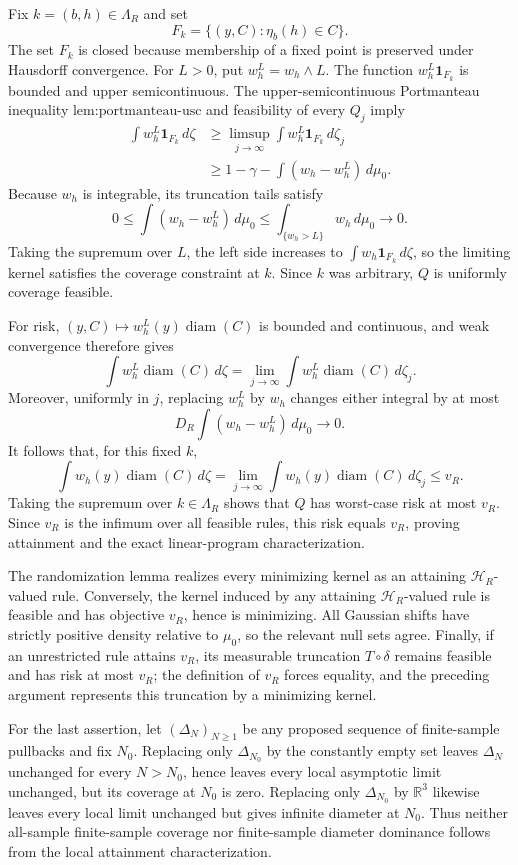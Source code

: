 Fix \(k=(b,h)\in\Lambda_R\) and set
\[
F_k=\{(y,C):\eta_b(h)\in C\}.
\]
The set \(F_k\) is closed because membership of a fixed point is preserved under Hausdorff convergence.  For \(L>0\), put \(w_h^L=w_h\wedge L\).  The function \(w_h^L\mathbf 1_{F_k}\) is bounded and upper semicontinuous.  The upper-semicontinuous Portmanteau inequality \(\text{lem:portmanteau-usc}\) and feasibility of every \(Q_j\) imply
\[
\begin{aligned}
\int w_h^L\mathbf 1_{F_k}\,d\zeta
&\ge \limsup_{j\to\infty}\int w_h^L\mathbf 1_{F_k}\,d\zeta_j\\
&\ge 1-\gamma-\int(w_h-w_h^L)\,d\mu_0.
\end{aligned}
\]
Because \(w_h\) is integrable, its truncation tails satisfy
\[
0\le\int(w_h-w_h^L)\,d\mu_0
\le\int_{\{w_h>L\}}w_h\,d\mu_0\longrightarrow0.
\]
Taking the supremum over \(L\), the left side increases to \(\int w_h\mathbf 1_{F_k}\,d\zeta\), so the limiting kernel satisfies the coverage constraint at \(k\).  Since \(k\) was arbitrary, \(Q\) is uniformly coverage feasible.

For risk, \((y,C)\mapsto w_h^L(y)\operatorname{diam}(C)\) is bounded and continuous, and weak convergence therefore gives
\[
\int w_h^L\operatorname{diam}(C)\,d\zeta
=\lim_{j\to\infty}\int w_h^L\operatorname{diam}(C)\,d\zeta_j.
\]
Moreover, uniformly in \(j\), replacing \(w_h^L\) by \(w_h\) changes either integral by at most
\[
D_R\int(w_h-w_h^L)\,d\mu_0\longrightarrow0.
\]
It follows that, for this fixed \(k\),
\[
\int w_h(y)\operatorname{diam}(C)\,d\zeta
=\lim_{j\to\infty}\int w_h(y)\operatorname{diam}(C)\,d\zeta_j
\le v_R.
\]
Taking the supremum over \(k\in\Lambda_R\) shows that \(Q\) has worst-case risk at most \(v_R\).  Since \(v_R\) is the infimum over all feasible rules, this risk equals \(v_R\), proving attainment and the exact linear-program characterization.

The randomization lemma realizes every minimizing kernel as an attaining \(\mathcal H_R\)-valued rule.  Conversely, the kernel induced by any attaining \(\mathcal H_R\)-valued rule is feasible and has objective \(v_R\), hence is minimizing.  All Gaussian shifts have strictly positive density relative to \(\mu_0\), so the relevant null sets agree.  Finally, if an unrestricted rule attains \(v_R\), its measurable truncation \(T\circ\delta\) remains feasible and has risk at most \(v_R\); the definition of \(v_R\) forces equality, and the preceding argument represents this truncation by a minimizing kernel.

For the last assertion, let \((\Delta_N)_{N\ge1}\) be any proposed sequence of finite-sample pullbacks and fix \(N_0\).  Replacing only \(\Delta_{N_0}\) by the constantly empty set leaves \(\Delta_N\) unchanged for every \(N>N_0\), hence leaves every local asymptotic limit unchanged, but its coverage at \(N_0\) is zero.  Replacing only \(\Delta_{N_0}\) by \(\mathbb R^3\) likewise leaves every local limit unchanged but gives infinite diameter at \(N_0\).  Thus neither all-sample finite-sample coverage nor finite-sample diameter dominance follows from the local attainment characterization.